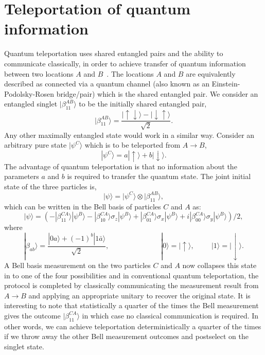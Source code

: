 \documentclass[12pt,letterpaper,aps,onecolumn,superscriptaddress,floatfix,notitlepage]{revtex4-1}
\begin{document}
	\section{Teleportation of quantum information\label{Ap:teleport}}
	Quantum teleportation uses shared entangled pairs and the ability to communicate classically, in order to achieve transfer of quantum information between two locations $A$ and $B$~\cite{bennett1993teleporting}. The locations $A$ and $B$ are equivalently described as connected via a quantum channel (also known as an Einstein-Podolsky-Rosen bridge/pair) which is the shared entangled pair. We consider an entangled singlet $|\beta^{AB}_{11}\rangle$ to be the initially shared entangled pair,
	\begin{equation}
	|\beta^{AB}_{11}\rangle = \frac{|\uparrow\downarrow\rangle-|\downarrow\uparrow\rangle}{\sqrt{2}}.
	\end{equation}
	Any other maximally entangled state would work in a similar way. Consider an arbitrary pure state $|\psi^{C}\rangle$ which is to be teleported from $A\rightarrow B$, 
	\begin{equation}|\psi^{C}\rangle = a|\uparrow\rangle + b|\downarrow\rangle.\end{equation}
	The advantage of quantum teleportation is that no information about the parameters $a$ and $b$ is required to transfer the quantum state. The joint initial state of the three particles is,
	\begin{equation}
	|\psi\rangle = |\psi^{C}\rangle\otimes|\beta^{AB}_{11}\rangle,
	\end{equation}
	which can be written in the Bell basis of particles $C$ and $A$ as:
	\begin{equation}\label{tp}|\psi\rangle = (-|\beta^{CA}_{11}\rangle|\psi^{B}\rangle-|\beta^{CA}_{10}\rangle\sigma_{z}|\psi^{B}\rangle+|\beta^{CA}_{01}\rangle\sigma_{x}|\psi^{B}\rangle+i|\beta^{CA}_{00}\rangle\sigma_{y}|\psi^{B}\rangle)/2,\end{equation}    
	where \begin{equation}|\beta_{ab}\rangle = \frac{|0a\rangle+(-1)^{b}|1\bar{a}\rangle}{\sqrt{2}},\hspace{1cm}\hspace{2cm}|0\rangle = |\uparrow\rangle,\hspace{1cm}|1\rangle = |\downarrow\rangle.\end{equation}
	A Bell basis measurement on the two particles $C$ and $A$ now collapses this state in to one of the four possibilities and in conventional quantum teleportation, the protocol is completed by classically communicating the measurement result from $A\rightarrow B$ and applying an appropriate unitary to recover the original state.  It is interesting to note that statistically a quarter of the times the Bell measurement gives the outcome $|\beta_{11}^{CA}\rangle$ in which case no classical communication is required. In other words, we can achieve teleportation deterministically a quarter of the times if we throw away the other Bell measurement outcomes and postselect on the singlet state.   
	
\end{document}
